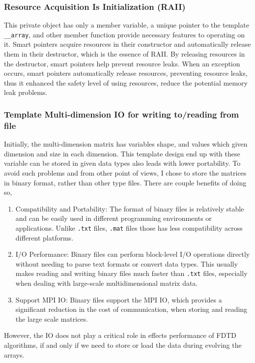 \subsubsection{Resource Acquisition Is Initialization (RAII)}
This private object has only a member variable, a unique pointer to the template \texttt{\_\_array}, 
and other member function provide necessary features to operating on it.
Smart pointers acquire resources in their constructor and automatically release them in their destructor, 
which is the essence of RAII. 
By releasing resources in the destructor, smart pointers help prevent resource leaks.
When an exception occurs, smart pointers automatically release resources, preventing resource leaks,
thus it enhanced the safety level of using resources, reduce the potential memory leak problems.


\subsubsection{Template Multi-dimension IO for writing to/reading from file}
Initially, the multi-dimension matrix has variables shape, 
and values which given dimension and size in each dimension.
This template design end up with these variable can be stored in given data types also leads with lower 
portability.
To avoid such problems and from other point of views, I chose to store the matrices in binary format, 
rather than other type files.
There are couple benefits of doing so,
\begin{enumerate}
  \item 	Compatibility and Portability: The format of binary files is relatively 
  stable and can be easily used in different programming environments or applications. 
  Unlike \texttt{.txt} files, \texttt{.mat} files those has less compatibility across different platforms.
  \item I/O Performance: Binary files can perform block-level I/O operations directly 
  without needing to parse text formats or convert data types. 
  This usually makes reading and writing binary files much faster than \texttt{.txt} files, 
  especially when dealing with large-scale multidimensional matrix data.
  \item Support MPI IO: Binary files support the MPI IO, which provides a significant reduction in the 
  cost of communication, when storing and reading the large scale matrices. 
\end{enumerate}
However, the IO does not play a critical role in effects performance of FDTD algorithms, if and only if 
we need to store or load the data during evolving the arrays.

